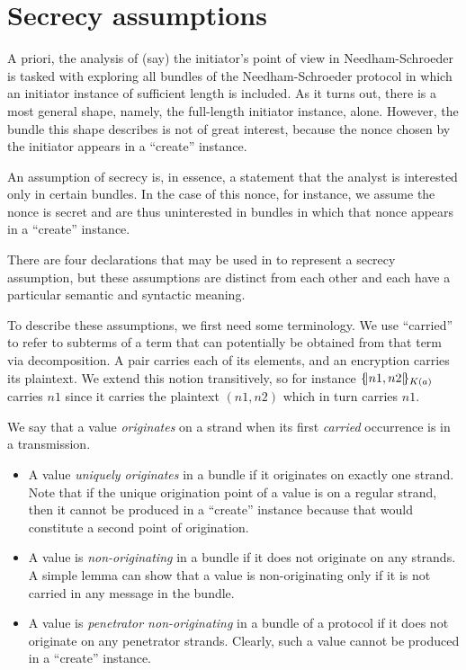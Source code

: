 \section{Secrecy assumptions}
\label{sec:secrecy_assumptions}
A priori, the analysis of (say) the initiator's point of view in
Needham-Schroeder is tasked with exploring all bundles of the
Needham-Schroeder protocol in which an initiator instance of
sufficient length is included.  As it turns out, there is a most
general shape, namely, the full-length initiator instance, alone.
However, the bundle this shape describes is not of great interest,
because the nonce chosen by the initiator appears in a ``create''
instance.

An assumption of secrecy is, in essence, a statement that the analyst
is interested only in certain bundles.  In the case of this nonce, for
instance, we assume the nonce is secret and are thus uninterested in
bundles in which that nonce appears in a ``create'' instance.

There are four declarations that may be used in {\cpsa} to represent
a secrecy assumption, but these assumptions are distinct from each other
and each have a particular semantic and syntactic meaning.

To describe these assumptions, we first need some terminology.  We
use ``carried'' to refer to subterms of a term that can potentially be
obtained from that term via decomposition. A pair carries each of its
elements, and an encryption carries its plaintext.  We extend this
notion transitively, so for instance $\{\!|n1, n2|\!\}_{K(a)}$ carries $n1$
since it carries the plaintext $(n1, n2)$ which in turn carries $n1$.

 We say that a value \emph{originates} on a strand
when its first \emph{carried} occurrence is in a transmission.

\begin{itemize}
\item A value \emph{uniquely originates} in a bundle if it originates
  on exactly one strand.  Note that if the unique origination point of
  a value is on a regular strand, then it cannot be produced in a
  ``create'' instance because that would constitute a second point of
  origination.

\item A value is \emph{non-originating} in a bundle if it does not
  originate on any strands.  A simple lemma can show that a value is
  non-originating only if it is not carried in any message in the
  bundle.

\item A value is \emph{penetrator non-originating} in a bundle of
  a protocol if it does not originate on any penetrator strands.
  Clearly, such a value cannot be produced in a ``create'' instance.
\end{itemize}

